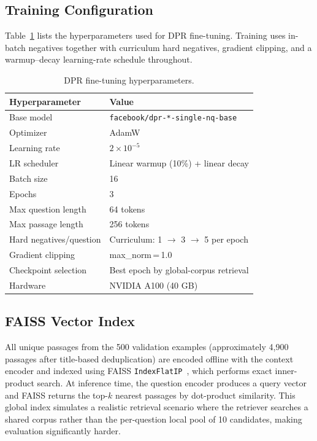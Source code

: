 \documentclass{llncs}
\begin{document}
\subsection{Training Configuration}

Table~\ref{tab:hyperparams} lists the hyperparameters used for DPR
fine-tuning. Training uses in-batch negatives together with curriculum
hard negatives, gradient clipping, and a warmup--decay learning-rate
schedule throughout.

\begin{table}[h]
\centering
\caption{DPR fine-tuning hyperparameters.}
\label{tab:hyperparams}
\begin{tabular}{ll}
\toprule
\textbf{Hyperparameter} & \textbf{Value} \\
\midrule
Base model              & \texttt{facebook/dpr-*-single-nq-base} \\
Optimizer               & AdamW \\
Learning rate           & $2 \times 10^{-5}$ \\
LR scheduler            & Linear warmup (10\%) + linear decay \\
Batch size              & 16 \\
Epochs                  & 3 \\
Max question length     & 64 tokens \\
Max passage length      & 256 tokens \\
Hard negatives/question & Curriculum: 1 $\to$ 3 $\to$ 5 per epoch \\
Gradient clipping       & max\_norm\,=\,1.0 \\
Checkpoint selection    & Best epoch by global-corpus retrieval \\
Hardware                & NVIDIA A100 (40 GB) \\
\bottomrule
\end{tabular}
\end{table}

\subsection{FAISS Vector Index}

All unique passages from the 500 validation examples (approximately 4{,}900
passages after title-based deduplication) are encoded offline with the
context encoder and indexed using FAISS
\texttt{IndexFlatIP}~\cite{johnson2019faiss}, which performs exact
inner-product search. At inference time, the question encoder produces a
query vector and FAISS returns the top-$k$ nearest passages by dot-product
similarity. This global index simulates a realistic retrieval scenario where
the retriever searches a shared corpus rather than the per-question local
pool of 10 candidates, making evaluation significantly harder.
\end{document}
